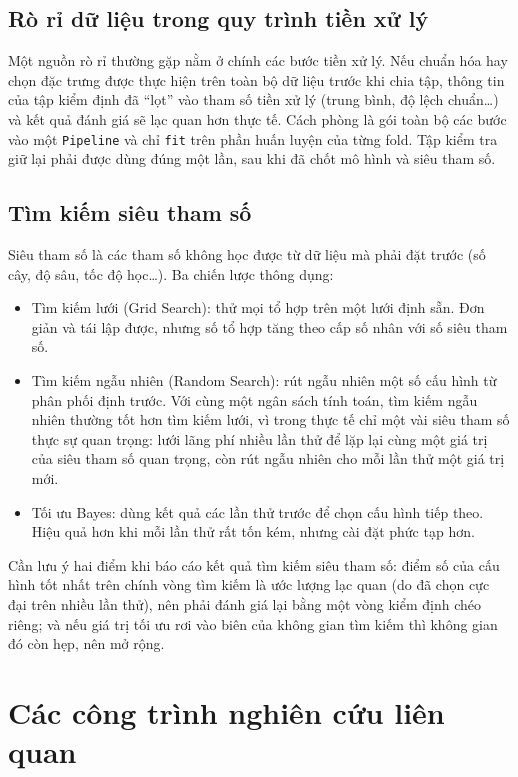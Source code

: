 \documentclass[12pt,a4paper,oneside]{report}
\begin{document}
\subsection{Rò rỉ dữ liệu trong quy trình tiền xử lý}
Một nguồn rò rỉ thường gặp nằm ở chính các bước tiền xử lý. Nếu chuẩn hóa hay
chọn đặc trưng được thực hiện trên toàn bộ dữ liệu trước khi chia tập,
thông tin của tập kiểm định đã ``lọt'' vào tham số tiền xử lý (trung bình, độ
lệch chuẩn\dots) và kết quả đánh giá sẽ lạc quan hơn thực tế. Cách phòng là gói
toàn bộ các bước vào một \texttt{Pipeline} \cite{pedregosa2011} và chỉ
\texttt{fit} trên phần huấn luyện của từng fold. Tập kiểm tra giữ lại phải được
dùng đúng một lần, sau khi đã chốt mô hình và siêu tham số.

\subsection{Tìm kiếm siêu tham số}
Siêu tham số là các tham số không học được từ dữ liệu mà phải đặt trước (số cây,
độ sâu, tốc độ học\dots). Ba chiến lược thông dụng:
\begin{itemize}
  \item Tìm kiếm lưới (Grid Search): thử mọi tổ hợp trên một lưới định
        sẵn. Đơn giản và tái lập được, nhưng số tổ hợp tăng theo cấp số nhân với
        số siêu tham số.
  \item Tìm kiếm ngẫu nhiên (Random Search): rút ngẫu nhiên một số cấu
        hình từ phân phối định trước. Với cùng một ngân sách tính toán, tìm
        kiếm ngẫu nhiên thường tốt hơn tìm kiếm lưới, vì trong thực tế chỉ một
        vài siêu tham số
        thực sự quan trọng: lưới lãng phí nhiều lần thử để lặp lại cùng một giá
        trị của siêu tham số quan trọng, còn rút ngẫu nhiên cho mỗi lần thử một
        giá trị mới.
  \item Tối ưu Bayes: dùng kết quả các lần thử trước để chọn cấu hình
        tiếp theo. Hiệu quả hơn khi mỗi lần thử rất tốn kém, nhưng cài đặt phức
        tạp hơn.
\end{itemize}
Cần lưu ý hai điểm khi báo cáo kết quả tìm kiếm siêu tham số: điểm số của cấu hình tốt nhất trên chính vòng tìm kiếm
là ước lượng lạc quan (do đã chọn cực đại trên nhiều lần thử), nên phải đánh giá
lại bằng một vòng kiểm định chéo riêng; và nếu giá trị tối ưu rơi vào biên
của không gian tìm kiếm thì không gian đó còn hẹp, nên mở rộng.

\section{Các công trình nghiên cứu liên quan}
\label{sec:lienquan}
\end{document}
